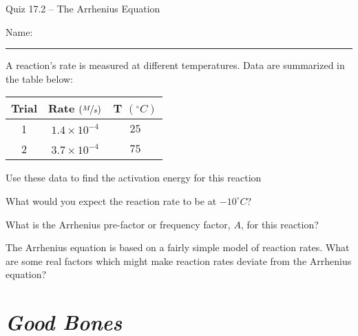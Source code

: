 \documentclass[11pt, letterpaper]{memoir}
\begin{document}
	\begin{center}
		{\large Quiz 17.2 -- The Arrhenius Equation}
	\end{center}
	{\large Name: \rule[-1mm]{4in}{.1pt} 


A reaction's rate is measured at different temperatures. Data are summarized in the table below:

\begin{tabular}{ccc}	
	Trial & Rate $\left(\nicefrac{M}{s}\right)$ & T $\left(^\circ C\right)$ \\ \midrule \midrule
	1 &$1.4\times10^{-4}$&$25$\\ \midrule
	2 &$3.7\times10^{-4}$&$75$ \\ \midrule
\end{tabular}

\noindent Use these data to find the activation energy for this reaction

\vspace{8em}
\noindent What would you expect the reaction rate to be at $-10^\circ C$?

\vspace{8em}
\noindent What is the Arrhenius pre-factor or frequency factor, $A$, for this reaction?


\vspace{8em}
\noindent The Arrhenius equation is based on a fairly simple model of reaction rates. What are some real factors which might make reaction rates deviate from the Arrhenius equation?

\newpage
\pagestyle{empty}
\addtocounter{page}{-1}	
\section*{\emph{Good Bones}}
}
\end{document}
